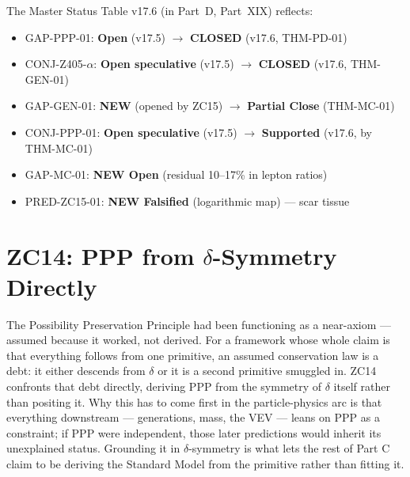 \documentclass[12pt, a4paper]{article}
\begin{document}
The Master Status Table v17.6 (in Part~D, Part~XIX) reflects:
\begin{itemize}[leftmargin=*, noitemsep]
\item GAP-PPP-01: \textbf{Open} (v17.5) $\to$ \textbf{CLOSED} (v17.6, THM-PD-01)
\item CONJ-Z405-$\alpha$: \textbf{Open speculative} (v17.5) $\to$ \textbf{CLOSED} (v17.6, THM-GEN-01)
\item GAP-GEN-01: \textbf{NEW} (opened by ZC15) $\to$ \textbf{Partial Close} (THM-MC-01)
\item CONJ-PPP-01: \textbf{Open speculative} (v17.5) $\to$ \textbf{Supported} (v17.6, by THM-MC-01)
\item GAP-MC-01: \textbf{NEW Open} (residual 10--17\% in lepton ratios)
\item PRED-ZC15-01: \textbf{NEW Falsified} (logarithmic map) --- scar tissue
\end{itemize}

\section{ZC14: PPP from $\delta$-Symmetry Directly}
\label{sec:zc14-ppp-direct}

The Possibility Preservation Principle had been functioning as a near-axiom ---
assumed because it worked, not derived. For a framework whose whole claim is that
everything follows from one primitive, an assumed conservation law is a debt: it
either descends from $\delta$ or it is a second primitive smuggled in. ZC14
confronts that debt directly, deriving PPP from the symmetry of $\delta$ itself
rather than positing it. Why this has to come first in the particle-physics arc
is that everything downstream --- generations, mass, the VEV --- leans on PPP as
a constraint; if PPP were independent, those later predictions would inherit its
unexplained status. Grounding it in $\delta$-symmetry is what lets the rest of
Part C claim to be deriving the Standard Model from the primitive rather than
fitting it.

\end{document}
